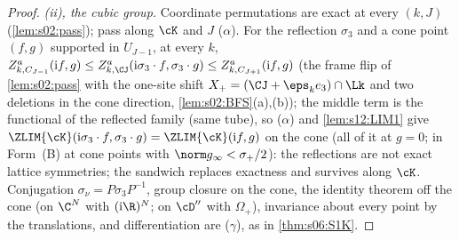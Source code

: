 \begin{proof}
\emph{(ii), the cubic group.} Coordinate permutations are exact at every $(k,J)$ (\cref{lem:s02:pass}); pass along $\cK$ and $J$ ($\alpha$). For the reflection $\sigma_3$ and a cone point $(f,g)$ supported in $U_{J-1}$, at every $k$, $Z^a_{k,C_{J-1}}(\mathrm if,g)\le Z^a_{k,\CJ}(\mathrm i\sigma_3\cdot f,\sigma_3\cdot g)\le Z^a_{k,C_{J+1}}(\mathrm if,g)$ (the frame flip of \cref{lem:s02:pass} with the one-site shift $X_+=(\CJ+\eps_ke_3)\cap\Lk$ and two deletions in the cone direction, \cref{lem:s02:BFS}(a),(b)); the middle term is the functional of the reflected family (same tube), so ($\alpha$) and \cref{lem:s12:LIM1} give $\ZLIM{\cK}(\mathrm i\sigma_3\cdot f,\sigma_3\cdot g)=\ZLIM{\cK}(\mathrm if,g)$ on the cone (all of it at $g=0$; in Form~(B) at cone points with $\norm g_\infty<\sigma_+/2$): the reflections are not exact lattice symmetries; the sandwich replaces exactness and survives along $\cK$. Conjugation $\sigma_\nu=P\sigma_3P^{-1}$, group closure on the cone, the identity theorem off the cone (on $\C^N$ with $(\mathrm i\R)^N$; on $\cD''$ with $\Omega_+$), invariance about every point by the translations, and differentiation are ($\gamma$), as in \cref{thm:s06:S1K}.


\end{proof}
